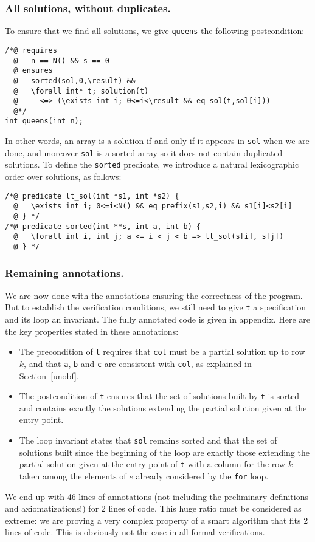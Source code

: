 \documentclass[a4paper]{llncs}
\begin{document}
\subsubsection{All solutions, without duplicates.}
To ensure that we find all solutions, we give \texttt{queens} the
following postcondition:
\begin{verbatim}
/*@ requires
  @   n == N() && s == 0
  @ ensures 
  @   sorted(sol,0,\result) &&
  @   \forall int* t; solution(t) 
  @     <=> (\exists int i; 0<=i<\result && eq_sol(t,sol[i]))
  @*/
int queens(int n);
\end{verbatim}
In other words, an array is a solution if and only if it appears in
\texttt{sol} when we are done, and moreover \texttt{sol} is a sorted
array so it does not contain duplicated solutions. To define the
\texttt{sorted} predicate, we introduce a natural lexicographic order
over solutions, as follows:
\begin{verbatim}
/*@ predicate lt_sol(int *s1, int *s2) {
  @   \exists int i; 0<=i<N() && eq_prefix(s1,s2,i) && s1[i]<s2[i]
  @ } */
/*@ predicate sorted(int **s, int a, int b) {
  @   \forall int i, int j; a <= i < j < b => lt_sol(s[i], s[j])
  @ } */
\end{verbatim}

\subsubsection{Remaining annotations.} 
We are now done with the annotations ensuring the correctness of the
program. But to establish the verification conditions, we still need
to give \texttt{t} a specification and its loop an invariant. The
fully annotated code is given in appendix. Here are the key properties
stated in these annotations:
\begin{itemize}
\item The precondition of \texttt{t} requires that \texttt{col} must be a
  partial solution up to row $k$, and that \texttt{a},
  \texttt{b} and \texttt{c} are consistent with \texttt{col}, as
  explained in Section~\ref{unobf}.
\item The postcondition of \texttt{t} ensures that the set of
  solutions built by \texttt{t} is sorted and contains exactly the 
  solutions extending the partial solution given at the entry point.
\item The loop invariant states that \texttt{sol} remains sorted and
  that the set of solutions built since the beginning of the loop are
  exactly those extending the partial solution given at the entry
  point of \texttt{t} with a column for the row $k$ taken among the
  elements of $e$ already considered by the \texttt{for} loop.
\end{itemize}
We end up with 46 lines of annotations (not including the preliminary
definitions and axiomatizations!) for 2 lines of code. This huge
ratio must be considered as extreme: we are proving a very complex
property of a smart algorithm that fits 2 lines of code. This
is obviously not the case in all formal verifications.
\end{document}
